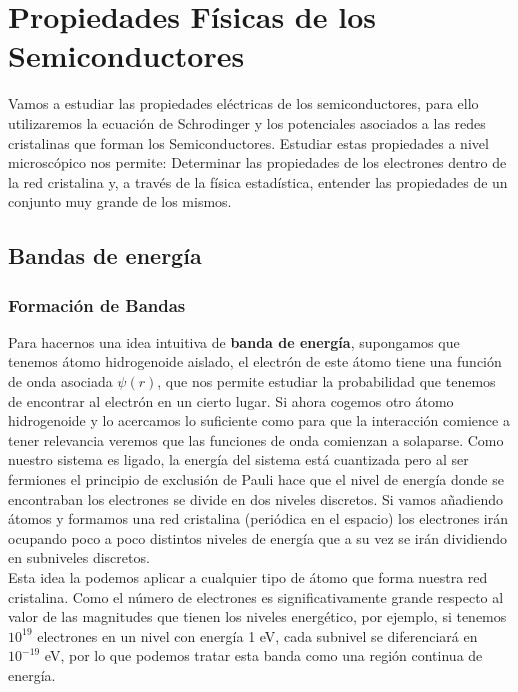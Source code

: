 \pagestyle{fancy}
\chapter{Propiedades Físicas de los Semiconductores}
Vamos a estudiar las propiedades eléctricas de los semiconductores, para ello utilizaremos la ecuación de Schrodinger y los potenciales asociados a las redes cristalinas que forman los Semiconductores. Estudiar estas propiedades a nivel microscópico nos permite: Determinar las propiedades de los electrones dentro de la red cristalina y, a través de la física estadística, entender las propiedades de un conjunto muy grande de los mismos.
\section{Bandas de energía} \label{sec: Bandas de energia}
\subsection{Formación de Bandas} \label{sec: Formacion de bandas}
Para hacernos una idea intuitiva de \textbf{banda de energía}, supongamos que tenemos átomo hidrogenoide aislado, el electrón de este átomo tiene una función de onda asociada $\psi(r)$, que nos permite estudiar la probabilidad que tenemos de encontrar al electrón en un cierto lugar. Si ahora cogemos otro átomo hidrogenoide y lo acercamos lo suficiente como para que la interacción comience a tener relevancia veremos que las funciones de onda comienzan a solaparse. Como nuestro sistema es ligado, la energía del sistema está cuantizada pero al ser fermiones el principio de exclusión de Pauli hace que el nivel de energía donde se encontraban los electrones se divide en dos niveles discretos. Si vamos añadiendo átomos y formamos una red cristalina (periódica en el espacio) los electrones irán ocupando poco a poco distintos niveles de energía que a su vez se irán dividiendo en subniveles discretos.\\

\noindent Esta idea la podemos aplicar a cualquier tipo de átomo que forma nuestra red cristalina. Como el número de electrones es significativamente grande respecto al valor de las magnitudes que tienen los niveles energético, por ejemplo, si tenemos $10^{19}$ electrones en un nivel con energía 1 eV, cada subnivel se diferenciará en $10^{-19}$ eV, por lo que podemos tratar esta banda como una región continua de energía.
\newpage

